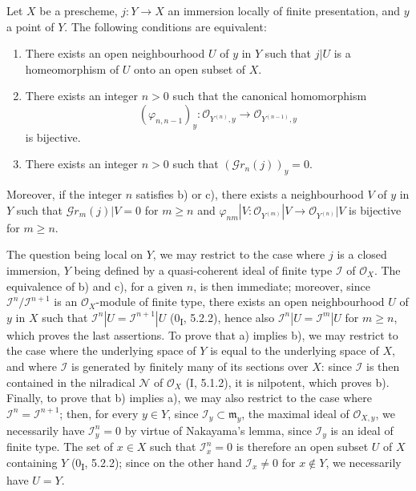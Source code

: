 \begin{proposition}[16.1.9]
\label{IV.16.1.9}
Let $X$ be a prescheme, $j:Y\to X$ an immersion locally of finite
presentation, and $y$ a point of $Y$. The following conditions are equivalent:
\begin{enumerate}
\item[(a)] There exists an open neighbourhood $U$ of $y$ in $Y$ such that $j|U$ is
a homeomorphism of $U$ onto an open subset of $X$.
\item[(b)] There exists an integer $n>0$ such that the canonical homomorphism
\[
  (\varphi_{n,n-1})_y:
  \mathcal{O}_{Y^{(n)},y}\longrightarrow\mathcal{O}_{Y^{(n-1)},y}
\]
is bijective.
\item[(c)] There exists an integer $n>0$ such that
$(\mathscr{G}r_n(j))_y=0$.
\end{enumerate}
Moreover, if the integer $n$ satisfies b) or c), there exists a neighbourhood $V$ of $y$
in $Y$ such that $\mathscr{G}r_m(j)|V=0$ for $m\geq n$ and
$\varphi_{nm}|V:\mathcal{O}_{Y^{(m)}}|V\to\mathcal{O}_{Y^{(n)}}|V$ is
bijective for $m\geq n$.
\end{proposition}

The question being local on $Y$, we may restrict to the case where $j$ is a
closed immersion, $Y$ being defined by a quasi-coherent ideal of finite type
$\mathscr{I}$ of $\mathcal{O}_X$. The equivalence of b) and c), for a given $n$,
is then immediate; moreover, since
$\mathscr{I}^n/\mathscr{I}^{n+1}$ is an $\mathcal{O}_X$-module of finite type,
there exists an open neighbourhood $U$ of $y$ in $X$ such that
$\mathscr{I}^n|U=\mathscr{I}^{n+1}|U$ (0\textsubscript{I}, 5.2.2), hence also
$\mathscr{I}^n|U=\mathscr{I}^m|U$ for $m\geq n$, which proves the last
assertions. To prove that a) implies b), we may restrict to the case where
the underlying space of $Y$ is equal to the underlying space of $X$, and where
$\mathscr{I}$ is generated by finitely many of its sections over $X$:
since $\mathscr{I}$ is then contained in the nilradical $\mathscr{N}$ of
$\mathcal{O}_X$ (I, 5.1.2), it is nilpotent, which proves b). Finally, to
prove that b) implies a), we may also restrict to the case where
$\mathscr{I}^n=\mathscr{I}^{n+1}$; then, for every $y\in Y$, since
$\mathscr{I}_y\subset\mathfrak{m}_y$, the maximal ideal of
$\mathcal{O}_{X,y}$, we necessarily have $\mathscr{I}_y^n=0$ by virtue of
Nakayama's lemma, since $\mathscr{I}_y$ is an ideal of finite type.
The set of $x\in X$ such that $\mathscr{I}_x^n=0$ is therefore an open subset $U$ of
$X$ containing $Y$ (0\textsubscript{I}, 5.2.2); since on the other hand
$\mathscr{I}_x\neq 0$ for $x\notin Y$, we necessarily have $U=Y$.

